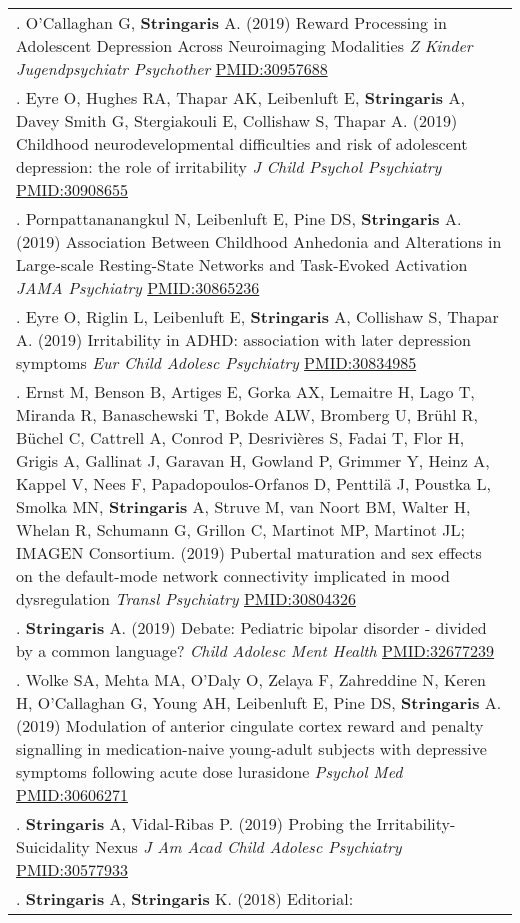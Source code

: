 \documentclass[
]{article}
\begin{document}
\begin{longtable}[]{@{}
  >{\raggedright\arraybackslash}p{}@{}}
86. O'Callaghan G, \textbf{Stringaris} A. (2019) Reward Processing in
Adolescent Depression Across Neuroimaging Modalities \emph{Z Kinder
Jugendpsychiatr Psychother} \url{PMID:30957688} \\
87. Eyre O, Hughes RA, Thapar AK, Leibenluft E, \textbf{Stringaris} A,
Davey Smith G, Stergiakouli E, Collishaw S, Thapar A. (2019) Childhood
neurodevelopmental difficulties and risk of adolescent depression: the
role of irritability \emph{J Child Psychol Psychiatry}
\url{PMID:30908655} \\
88. Pornpattananangkul N, Leibenluft E, Pine DS, \textbf{Stringaris} A.
(2019) Association Between Childhood Anhedonia and Alterations in
Large-scale Resting-State Networks and Task-Evoked Activation \emph{JAMA
Psychiatry} \url{PMID:30865236} \\
89. Eyre O, Riglin L, Leibenluft E, \textbf{Stringaris} A, Collishaw S,
Thapar A. (2019) Irritability in ADHD: association with later depression
symptoms \emph{Eur Child Adolesc Psychiatry} \url{PMID:30834985} \\
90. Ernst M, Benson B, Artiges E, Gorka AX, Lemaitre H, Lago T, Miranda
R, Banaschewski T, Bokde ALW, Bromberg U, Brühl R, Büchel C, Cattrell A,
Conrod P, Desrivières S, Fadai T, Flor H, Grigis A, Gallinat J, Garavan
H, Gowland P, Grimmer Y, Heinz A, Kappel V, Nees F, Papadopoulos-Orfanos
D, Penttilä J, Poustka L, Smolka MN, \textbf{Stringaris} A, Struve M,
van Noort BM, Walter H, Whelan R, Schumann G, Grillon C, Martinot MP,
Martinot JL; IMAGEN Consortium. (2019) Pubertal maturation and sex
effects on the default-mode network connectivity implicated in mood
dysregulation \emph{Transl Psychiatry} \url{PMID:30804326} \\
91. \textbf{Stringaris} A. (2019) Debate: Pediatric bipolar disorder -
divided by a common language? \emph{Child Adolesc Ment Health}
\url{PMID:32677239} \\
92. Wolke SA, Mehta MA, O'Daly O, Zelaya F, Zahreddine N, Keren H,
O'Callaghan G, Young AH, Leibenluft E, Pine DS, \textbf{Stringaris} A.
(2019) Modulation of anterior cingulate cortex reward and penalty
signalling in medication-naive young-adult subjects with depressive
symptoms following acute dose lurasidone \emph{Psychol Med}
\url{PMID:30606271} \\
93. \textbf{Stringaris} A, Vidal-Ribas P. (2019) Probing the
Irritability-Suicidality Nexus \emph{J Am Acad Child Adolesc Psychiatry}
\url{PMID:30577933} \\
94. \textbf{Stringaris} A, \textbf{Stringaris} K. (2018) Editorial:

\end{longtable}
\end{document}
